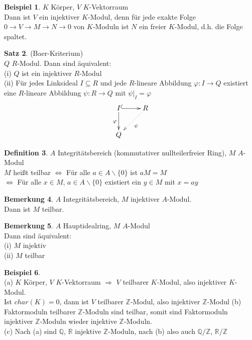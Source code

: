 \documentclass[10pt,a4paper,numbers=endperiod]{scrreprt}
\theoremstyle{definition}
\newtheorem{satz}{Satz}[section]
\newtheorem{defi}[satz]{Definition}
\newtheorem{bem}[satz]{Bemerkung}
\newtheorem{bsp}[satz]{Beispiel}
\def\QQ{{\mathbb Q}}
\def\RR{{\mathbb R}}
\def\ZZ{{\mathbb Z}}
\begin{document}
\begin{bsp}
	$K$ Körper, $V$ $K$-Vektorraum\\
	Dann ist $V$ ein injektiver $K$-Modul, denn für jede exakte Folge $0 \to V \to M \to N \to 0$ von $K$-Moduln ist $N$ ein freier $K$-Modul, d.h. die Folge spaltet.
\end{bsp}

\begin{satz}
	(Baer-Kriterium)\\
	$Q$ $R$-Modul. Dann sind äquivalent:\\
	(i) $Q$ ist ein injektiver $R$-Modul\\
	(ii) Für jedes Linksideal $I \subseteq R$ und jede $R$-lineare Abbildung $\varphi: I \to Q$ existiert eine $R$-lineare Abbildung $\psi: R \to Q$ mit $\psi|_I = \varphi$ \begin{align*}
	\xymatrix{ I \ar[d]_\varphi \ar@{^{(}->}[r] & R \ar@{.>}[dl]^\psi\\
		Q &
	}
	\end{align*}
\end{satz}

\begin{defi}
	$A$ Integritätsbereich (kommutativer nullteilerfreier Ring), $M$ $A$-Modul\\
	$M$ heißt teilbar $\Leftrightarrow$ Für alle $a \in A \backslash \{0\}$ ist $aM = M$\\
	\hspace*{21.2mm} $\Leftrightarrow$ Für alle $x \in M$, $a \in A \backslash \{0\}$ existiert ein $y \in M$ mit $x = ay$
\end{defi}

\begin{bem}
	$A$ Integritätsbereich, $M$ injektiver $A$-Modul.\\
	Dann ist $M$ teilbar.
\end{bem}

\begin{bem}
	$A$ Hauptidealring, $M$ $A$-Modul\\
	Dann sind äquivalent:\\
	(i) $M$ injektiv\\
	(ii) $M$ teilbar
\end{bem}

\begin{bsp}
	$ $\\
	(a) $K$ Körper, $V$ $K$-Vektorraum $\Rightarrow$ $V$ teilbarer $K$-Modul, also injektiver $K$-Modul.\\
	Ist $char(K) = 0$, dann ist $V$ teilbarer $\ZZ$-Modul, also injektiver $\ZZ$-Modul
	(b) Faktormoduln teilbarer $\ZZ$-Moduln sind teilbar, somit sind Faktormoduln injektiver $\ZZ$-Moduln wieder injektive $\ZZ$-Moduln.\\
	(c) Nach (a) sind $\QQ$, $\RR$ injektive $\ZZ$-Moduln, nach (b) also auch $\QQ/\ZZ$, $\RR/\ZZ$
\end{bsp}
\end{document}
